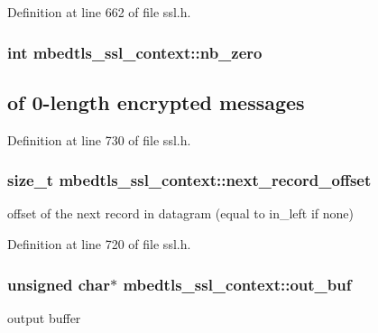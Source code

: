 Definition at line 662 of file ssl.\-h.

\hypertarget{structmbedtls__ssl__context_a4b988651d1c7320f119d3d80f9af7d94}{
\subsubsection[{nb\-\_\-zero}]{\setlength{\rightskip}{0pt plus 5cm}int mbedtls\-\_\-ssl\-\_\-context\-::nb\-\_\-zero}}\label{structmbedtls__ssl__context_a4b988651d1c7320f119d3d80f9af7d94}
\subsection*{of 0-\/length encrypted messages}

Definition at line 730 of file ssl.\-h.

\hypertarget{structmbedtls__ssl__context_a97191c6503f07466475793478e195803}{
\subsubsection[{next\-\_\-record\-\_\-offset}]{\setlength{\rightskip}{0pt plus 5cm}size\-\_\-t mbedtls\-\_\-ssl\-\_\-context\-::next\-\_\-record\-\_\-offset}}\label{structmbedtls__ssl__context_a97191c6503f07466475793478e195803}
offset of the next record in datagram (equal to in\-\_\-left if none) 

Definition at line 720 of file ssl.\-h.

\hypertarget{structmbedtls__ssl__context_a77df97cbed2923f1162034c6e9c2ad4d}{
\subsubsection[{out\-\_\-buf}]{\setlength{\rightskip}{0pt plus 5cm}unsigned char$\ast$ mbedtls\-\_\-ssl\-\_\-context\-::out\-\_\-buf}}\label{structmbedtls__ssl__context_a77df97cbed2923f1162034c6e9c2ad4d}
output buffer 

